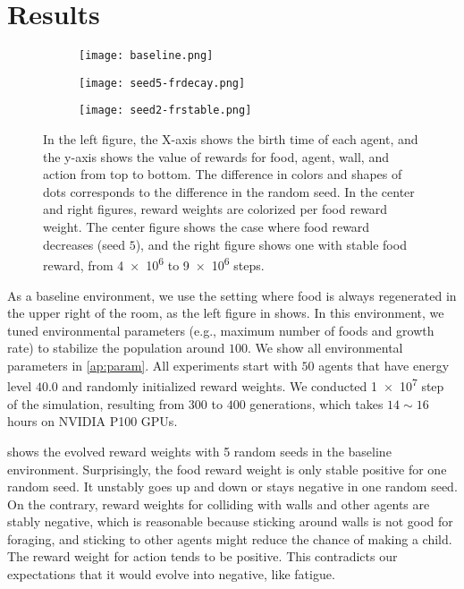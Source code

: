 \section{Results}

\begin{figure}[t]
  \begin{subfigure}[t]{5cm}
    \centering
    \texttt{[image: baseline.png]}
    \label{subfigure:bl}
  \end{subfigure}
  \begin{subfigure}[t]{5cm}
    \centering
    \texttt{[image: seed5-frdecay.png]}
    \label{subfigure:s5}
  \end{subfigure}
  \begin{subfigure}[t]{5cm}
    \centering
    \texttt{[image: seed2-frstable.png]}
    \label{subfigure:s2}
  \end{subfigure}
  \caption{
    In the left figure, the X-axis shows the birth time of each agent, and the y-axis shows the value of rewards for food, agent, wall, and action from top to bottom. The difference in colors and shapes of dots corresponds to the difference in the random seed. In the center and right figures, reward weights are colorized per food reward weight. The center figure shows the case where food reward decreases (seed $5$), and the right figure shows one with stable food reward,  from \num{4e6} to \num{9e6} steps.
  }\label{figure:baseline-result}
\end{figure}

As a baseline environment, we use the setting where food is always regenerated in the upper right of the room, as the left figure in  shows. In this environment, we tuned environmental parameters (e.g., maximum number of foods and growth rate) to stabilize the population around $100$. We show all environmental parameters in \cref{ap:param}. All experiments start with $50$ agents that have energy level $40.0$ and randomly initialized reward weights. We conducted \num{1e7} step of the simulation, resulting from $300$ to $400$ generations, which takes $14\sim16$ hours on NVIDIA P100 GPUs.

 shows the evolved reward weights with 5 random seeds in the baseline environment. Surprisingly, the food reward weight is only stable positive for one random seed. It unstably goes up and down or stays negative in one random seed. On the contrary, reward weights for colliding with walls and other agents are stably negative, which is reasonable because sticking around walls is not good for foraging, and sticking to other agents might reduce the chance of making a child. The reward weight for action tends to be positive. This contradicts our expectations that it would evolve into negative, like fatigue.

